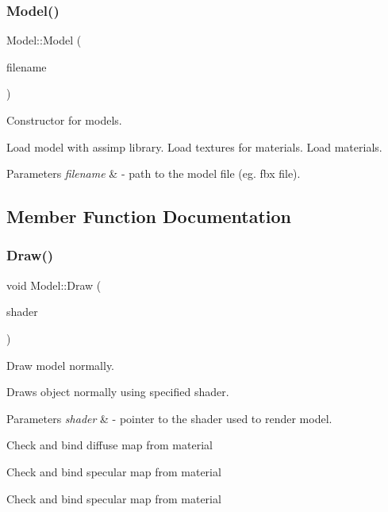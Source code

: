 \subsubsection{\texorpdfstring{Model()}{Model()}}
{\footnotesize\ttfamily Model\+::\+Model (\begin{DoxyParamCaption}\item[{G\+Lchar $\ast$}]{filename }\end{DoxyParamCaption})}



Constructor for models. 

Load model with assimp library. Load textures for materials. Load materials. 
\begin{DoxyParams}{Parameters}
{\em filename} & -\/ path to the model file (eg. fbx file). \\
\hline
\end{DoxyParams}


\subsection{Member Function Documentation}
\mbox{\label{class_model_a8444e404fcc9cc66827c2f628b92ece3}} 
\subsubsection{\texorpdfstring{Draw()}{Draw()}}
{\footnotesize\ttfamily void Model\+::\+Draw (\begin{DoxyParamCaption}\item[{\mbox{\hyperlink{class_shader}{Shader}} $\ast$}]{shader }\end{DoxyParamCaption})}



Draw model normally. 

Draws object normally using specified shader. 
\begin{DoxyParams}{Parameters}
{\em shader} & -\/ pointer to the shader used to render model. \\
\hline
\end{DoxyParams}
Check and bind diffuse map from material

Check and bind specular map from material

Check and bind specular map from material \mbox{\label{class_model_ac2e396a05a6b7af011c213dcbd2dae21}} 
